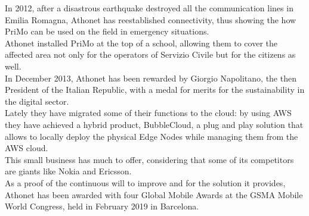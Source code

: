 	In 2012, after a disastrous earthquake destroyed all the communication lines in Emilia Romagna, Athonet has reestablished connectivity, thus showing the how PriMo can be used on the field in emergency situations.\\
	Athonet installed PriMo at the top of a school, allowing them to cover the affected area not only for the operators of Servizio Civile but for the citizens as well.\\
	In December 2013, Athonet has been rewarded by Giorgio Napolitano, the then President of the Italian Republic, with a medal for merits for the sustainability in the digital sector\cite{athonet_presidente}.\\
	Lately they have migrated some of their functions to the cloud: by using AWS they have achieved a hybrid product, BubbleCloud, a plug and play solution that allows to locally deploy the physical Edge Nodes while managing them from the AWS cloud.\\
	This small business has much to offer, considering that some of its competitors are giants like Nokia and Ericsson.\\
	As a proof of the continuous will to improve and for the solution it provides, Athonet has been awarded with four Global Mobile Awards at the GSMA Mobile World Congress, held in February 2019 in Barcelona\cite{athonet_premi}.

